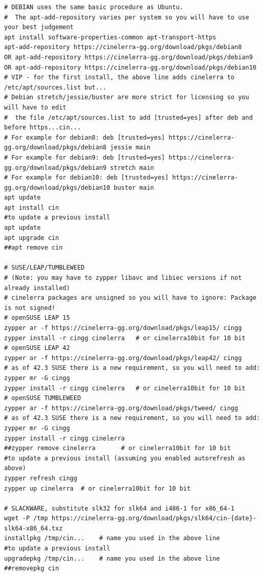 \begin{lstlisting}[numbers=none]
# DEBIAN uses the same basic procedure as Ubuntu.
#  The apt-add-repository varies per system so you will have to use your best judgement
apt install software-properties-common apt-transport-https
apt-add-repository https://cinelerra-gg.org/download/pkgs/debian8
OR apt-add-repository https://cinelerra-gg.org/download/pkgs/debian9
OR apt-add-repository https://cinelerra-gg.org/download/pkgs/debian10
# VIP - for the first install, the above line adds cinelerra to /etc/apt/sources.list but...
# Debian stretch/jessie/buster are more strict for licensing so you will have to edit
#  the file /etc/apt/sources.list to add [trusted=yes] after deb and before https...cin...
# For example for debian8: deb [trusted=yes] https://cinelerra-gg.org/download/pkgs/debian8 jessie main
# For example for debian9: deb [trusted=yes] https://cinelerra-gg.org/download/pkgs/debian9 stretch main
# For example for debian10: deb [trusted=yes] https://cinelerra-gg.org/download/pkgs/debian10 buster main
apt update
apt install cin
#to update a previous install
apt update
apt upgrade cin
##apt remove cin

# SUSE/LEAP/TUMBLEWEED
# (Note: you may have to zypper libavc and libiec versions if not already installed)
# cinelerra packages are unsigned so you will have to ignore: Package is not signed!
# openSUSE LEAP 15
zypper ar -f https://cinelerra-gg.org/download/pkgs/leap15/ cingg
zypper install -r cingg cinelerra   # or cinelerra10bit for 10 bit
# openSUSE LEAP 42 
zypper ar -f https://cinelerra-gg.org/download/pkgs/leap42/ cingg
# as of 42.3 SUSE there is a new requirement, so you will need to add:
zypper mr -G cingg
zypper install -r cingg cinelerra   # or cinelerra10bit for 10 bit
# openSUSE TUMBLEWEED
zypper ar -f https://cinelerra-gg.org/download/pkgs/tweed/ cingg
# as of 42.3 SUSE there is a new requirement, so you will need to add:
zypper mr -G cingg
zypper install -r cingg cinelerra
##zypper remove cinelerra	    # or cinelerra10bit for 10 bit
#to update a previous install (assuming you enabled autorefresh as above)
zypper refresh cingg
zypper up cinelerra  # or cinelerra10bit for 10 bit

# SLACKWARE, substitute slk32 for slk64 and i486-1 for x86_64-1
wget -P /tmp https://cinelerra-gg.org/download/pkgs/slk64/cin-{date}-slk64-x86_64.txz
installpkg /tmp/cin...    # name you used in the above line
#to update a previous install
upgradepkg /tmp/cin...    # name you used in the above line
##removepkg cin


\end{lstlisting}
